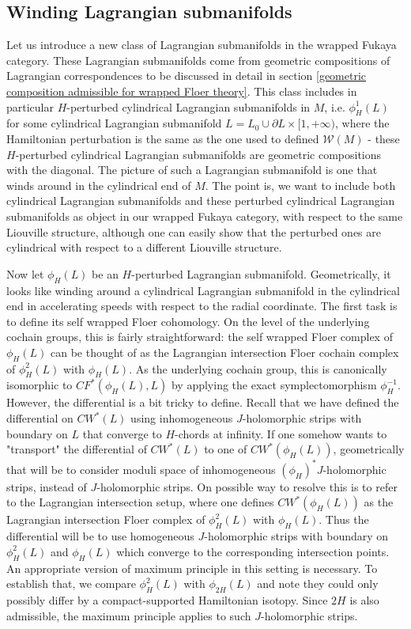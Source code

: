 \documentclass{amsart}
\numberwithin{equation}{section}
\numberwithin{figure}{section}
\begin{document}
\subsection{Winding Lagrangian submanifolds}
	Let us introduce a new class of Lagrangian submanifolds in the wrapped Fukaya category. These Lagrangian submanifolds come from geometric compositions of Lagrangian correspondences to be discussed in detail in section \ref{geometric composition admissible for wrapped Floer theory}. This class includes in particular $H$-perturbed cylindrical Lagrangian submanifolds in $M$, i.e. $\phi_{H}^{1}(L)$ for some cylindrical Lagrangian submanifold $L = L_{0} \cup \partial L \times [1, +\infty)$, where the Hamiltonian perturbation is the same as the one used to defined $\mathcal{W}(M)$ - these $H$-perturbed cylindrical Lagrangian submanifolds are geometric compositions with the diagonal. The picture of such a Lagrangian submanifold is one that winds around in the cylindrical end of $M$. The point is, we want to include both cylindrical Lagrangian submanifolds and these perturbed cylindrical Lagrangian submanifolds as object in our wrapped Fukaya category, with respect to the same Liouville structure, although one can easily show that the perturbed ones are cylindrical with respect to a different Liouville structure. \par
	Now let $\phi_{H}(L)$ be an $H$-perturbed Lagrangian submanifold. Geometrically, it looks like winding around a cylindrical Lagrangian submanifold in the cylindrical end in accelerating speeds with respect to the radial coordinate. The first task is to define its self wrapped Floer cohomology. On the level of the underlying cochain groups, this is fairly straightforward: the self wrapped Floer complex of $\phi_{H}(L)$ can be thought of as the Lagrangian intersection Floer cochain complex of $\phi_{H}^{2}(L)$ with $\phi_{H}(L)$. As the underlying cochain group, this is canonically isomorphic to $CF^{*}(\phi_{H}(L), L)$ by applying the exact symplectomorphism $\phi_{H}^{-1}$. However, the differential is a bit tricky to define. Recall that we have defined the differential on $CW^{*}(L)$ using inhomogeneous $J$-holomorphic strips with boundary on $L$ that converge to $H$-chords at infinity. If one somehow wants to "transport" the differential of $CW^{*}(L)$ to one of $CW^{*}(\phi_{H}(L))$, geometrically that will be to consider moduli space of inhomogeneous $(\phi_{H})^{*}J$-holomorphic strips, instead of $J$-holomorphic strips. On possible way to resolve this is to refer to the Lagrangian intersection setup, where one defines $CW^{*}(\phi_{H}(L))$ as the Lagrangian intersection Floer complex of $\phi_{H}^{2}(L)$ with $\phi_{H}(L)$. Thus the differential will be to use homogeneous $J$-holomorphic strips with boundary on $\phi_{H}^{2}(L)$ and $\phi_{H}(L)$ which converge to the corresponding intersection points. An appropriate version of maximum principle in this setting is necessary. To establish that, we compare $\phi_{H}^{2}(L)$ with $\phi_{2H}(L)$ and note they could only possibly differ by a compact-supported Hamiltonian isotopy. Since $2H$ is also admissible, the maximum principle applies to such $J$-holomorphic strips. \par
\end{document}
